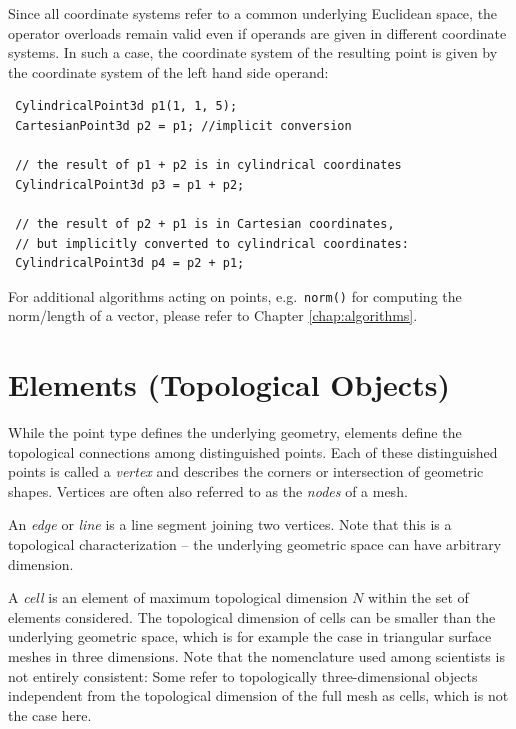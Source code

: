
Since all coordinate systems refer to a common underlying Euclidean space, the operator overloads remain valid even if operands are given in different coordinate systems. In such a case, the coordinate system of the resulting point is given by the coordinate system of the left hand side operand:
\begin{lstlisting}
 CylindricalPoint3d p1(1, 1, 5);
 CartesianPoint3d p2 = p1; //implicit conversion

 // the result of p1 + p2 is in cylindrical coordinates
 CylindricalPoint3d p3 = p1 + p2;

 // the result of p2 + p1 is in Cartesian coordinates,
 // but implicitly converted to cylindrical coordinates:
 CylindricalPoint3d p4 = p2 + p1;
\end{lstlisting}
For additional algorithms acting on points, e.g.~\lstinline|norm()| for computing the norm/length of a vector, please refer to Chapter \ref{chap:algorithms}.


\section{Elements (Topological Objects)} \label{sec:ncells}
While the point type defines the underlying geometry, elements define the topological connections among distinguished points. Each of these distinguished points is called a \emph{vertex} and describes the corners or intersection of geometric shapes. Vertices are often also referred to as the \emph{nodes} of a mesh.

An \emph{edge} or \emph{line} is a line segment joining two vertices.
Note that this is a topological characterization -- the underlying geometric space can have arbitrary dimension.

A \emph{cell} is an element of maximum topological dimension $N$ within the set of elements considered.
The topological dimension of cells can be smaller than the underlying geometric space, which is for example the case in triangular surface meshes in three dimensions.
Note that the nomenclature used among scientists is not entirely consistent:
Some refer to topologically three-dimensional objects independent from the topological dimension of the full mesh as cells, which is not the case here.

